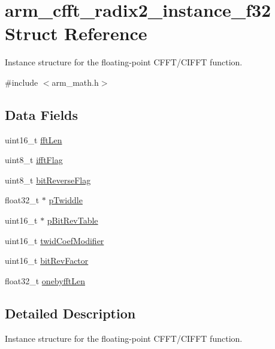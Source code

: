 \hypertarget{structarm__cfft__radix2__instance__f32}{}\section{arm\+\_\+cfft\+\_\+radix2\+\_\+instance\+\_\+f32 Struct Reference}
\label{structarm__cfft__radix2__instance__f32}


Instance structure for the floating-\/point C\+F\+F\+T/\+C\+I\+F\+FT function.  




{\ttfamily \#include $<$arm\+\_\+math.\+h$>$}

\subsection*{Data Fields}
\begin{DoxyCompactItemize}
\item 
uint16\+\_\+t \hyperlink{structarm__cfft__radix2__instance__f32_ab8db3bbe7c61e6bb8ca2a55e3446e11a}{fft\+Len}
\item 
uint8\+\_\+t \hyperlink{structarm__cfft__radix2__instance__f32_ad6ca6e223f986ebfd94c5ee1e410aa73}{ifft\+Flag}
\item 
uint8\+\_\+t \hyperlink{structarm__cfft__radix2__instance__f32_a09a221a818c6d0e064557a99e2fe9a8b}{bit\+Reverse\+Flag}
\item 
float32\+\_\+t $\ast$ \hyperlink{structarm__cfft__radix2__instance__f32_aca581481fccdff0f557f54a3ef20d967}{p\+Twiddle}
\item 
uint16\+\_\+t $\ast$ \hyperlink{structarm__cfft__radix2__instance__f32_a46a2fb328199897af100fea0bfdf59aa}{p\+Bit\+Rev\+Table}
\item 
uint16\+\_\+t \hyperlink{structarm__cfft__radix2__instance__f32_afe772e5b5001c9d8e85032115a8df5bf}{twid\+Coef\+Modifier}
\item 
uint16\+\_\+t \hyperlink{structarm__cfft__radix2__instance__f32_a33386d95319dc3ee7097b3a8e52e01ec}{bit\+Rev\+Factor}
\item 
float32\+\_\+t \hyperlink{structarm__cfft__radix2__instance__f32_acf295a7b97b7d48a9cae4d1ab5ed00f6}{onebyfft\+Len}
\end{DoxyCompactItemize}


\subsection{Detailed Description}
Instance structure for the floating-\/point C\+F\+F\+T/\+C\+I\+F\+FT function. 

